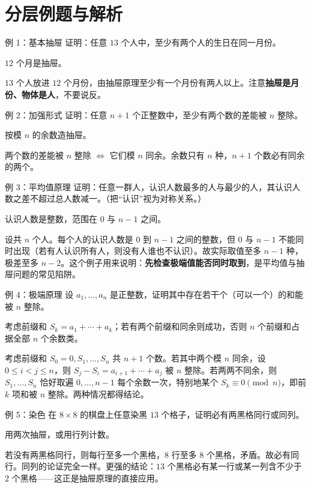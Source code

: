 \section{分层例题与解析}
\begin{problem}{例 1：基本抽屉}
证明：任意 $13$ 个人中，至少有两个人的生日在同一月份。
\end{problem}
\hint $12$ 个月是抽屉。

\sol $13$ 个人放进 $12$ 个月份，由抽屉原理至少有一个月份有两人以上。注意\textbf{抽屉是月份、物体是人}，不要说反。

\begin{problem}{例 2：加强形式}
证明：任意 $n+1$ 个正整数中，至少有两个数的差能被 $n$ 整除。
\end{problem}
\hint 按模 $n$ 的余数造抽屉。

\sol 两个数的差能被 $n$ 整除 $\iff$ 它们模 $n$ 同余。余数只有 $n$ 种，$n+1$ 个数必有同余的两个。

\begin{problem}{例 3：平均值原理}
证明：任意一群人，认识人数最多的人与最少的人，其认识人数之差不超过总人数减一。（把“认识”视为对称关系。）
\end{problem}
\hint 认识人数是整数，范围在 $0$ 与 $n-1$ 之间。

\sol 设共 $n$ 个人。每个人的认识人数是 $0$ 到 $n-1$ 之间的整数，但 $0$ 与 $n-1$ 不能同时出现（若有人认识所有人，则没有人谁也不认识）。故实际取值至多 $n-1$ 种，极差至多 $n-2$。这个例子用来说明：\textbf{先检查极端值能否同时取到}，是平均值与抽屉问题的常见陷阱。

\begin{problem}{例 4：极端原理}
设 $a_1,\ldots,a_n$ 是正整数，证明其中存在若干个（可以一个）的和能被 $n$ 整除。
\end{problem}
\hint 考虑前缀和 $S_k=a_1+\cdots+a_k$；若有两个前缀和同余则成功，否则 $n$ 个前缀和占据全部 $n$ 个余数类。

\sol 考虑前缀和 $S_0=0,S_1,\ldots,S_n$ 共 $n+1$ 个数。若其中两个模 $n$ 同余，设 $0\le i<j\le n$，则 $S_j-S_i=a_{i+1}+\cdots+a_j$ 被 $n$ 整除。若两两不同余，则 $S_1,\ldots,S_n$ 恰好取遍 $0,\ldots,n-1$ 每个余数一次，特别地某个 $S_k\equiv0\pmod n$，即前 $k$ 项和被 $n$ 整除。两种情况都得结论。

\begin{problem}{例 5：染色}
在 $8\times8$ 的棋盘上任意染黑 $13$ 个格子，证明必有两黑格同行或同列。
\end{problem}
\hint 用两次抽屉，或用行列计数。

\sol 若没有两黑格同行，则每行至多一个黑格，$8$ 行至多 $8$ 个黑格，矛盾。故必有同行。同列的论证完全一样。更强的结论：$13$ 个黑格必有某一行或某一列含不少于 $2$ 个黑格——这正是抽屉原理的直接应用。

